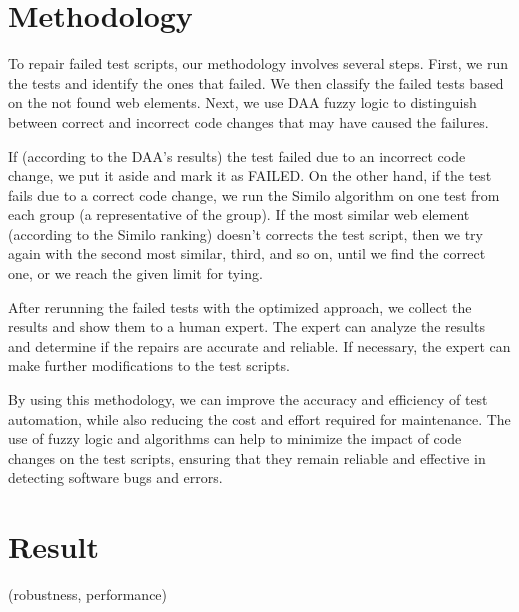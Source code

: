 \documentclass{article}
\begin{document}
\maketitle

\section{Methodology}

To repair failed test scripts, our methodology involves several steps. First, we run the tests and identify the ones that failed. We then classify the failed tests based on the not found web elements. Next, we use DAA fuzzy logic to distinguish between correct and incorrect code changes that may have caused the failures.

If (according to the DAA's results) the test failed due to an incorrect code change, we put it aside and mark it as FAILED. On the other hand, if the test fails due to a correct code change, we run the Similo algorithm on one test from each group (a representative of the group). If the most similar web element (according to the Similo ranking) doesn't corrects the test script, then we try again with the second most similar, third, and so on, until we find the correct one, or we reach the given limit for tying. 

After rerunning the failed tests with the optimized approach, we collect the results and show them to a human expert. The expert can analyze the results and determine if the repairs are accurate and reliable. If necessary, the expert can make further modifications to the test scripts.

By using this methodology, we can improve the accuracy and efficiency of test automation, while also reducing the cost and effort required for maintenance. The use of fuzzy logic and algorithms can help to minimize the impact of code changes on the test scripts, ensuring that they remain reliable and effective in detecting software bugs and errors.



\maketitle

\section{Result}

(robustness, performance)
\end{document}
